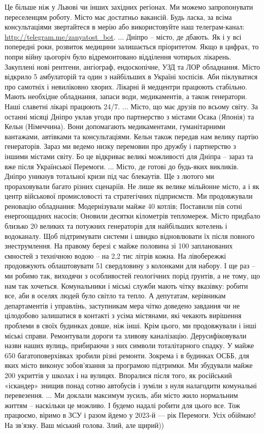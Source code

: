Це більше ніж у Львові чи інших західних регіонах.
Ми можемо запропонувати переселенцям роботу.
Місто має достатньо вакансій. Будь ласка, за всіма консультаціями звертайтеся в
мерію або використовуйте наш телеграм-канал: \url{http://telegram.me/zanyatost_bot}.
...
Дніпро – місто, де дбають. 
Як і у всі попередні роки, розвиток медицини залишається пріоритетом. 
Якщо в цифрах, то попри війну цьогоріч було відремонтовано відділення чотирьох лікарень. 
Закуплені нові рентгени, ангіограф, ендоскопічне, УЗД та ЛОР обладнання.
Місто відкрило 5 амбулаторій та один з найбільших в Україні хоспісів. 
Аби піклуватися про самотніх і невиліковно хворих. 
Лікарні й медцентри працюють стабільно. Мають необхідне обладнання, запаси води, медикаментів, а також генератори. Наші славетні лікарі працюють 24/7.
...
Місто, що має друзів по всьому світу.
За останні місяці Дніпро уклав угоди про партнерство з містами Осака (Японія) та Кельн (Німеччина). 
Вони допомагають медикаментами, гуманітарними вантажами, автівками та консультаціями.  
Кельн також передав нам велику партію генераторів. 
Зараз ми ведемо низку перемовин про дружбу і партнерство з іншими містами світу. 
Бо це відкриває великі можливості для Дніпра – зараз та вже після Української Перемоги. 
...
Місто, де готові до будь-яких викликів.
Дніпро уникнув тотальної кризи під час блекаутів. 
Ще з лютого ми прораховували багато різних сценаріїв. 
Не лише як велике мільйонне місто, а і як центр військової промисловості та стратегічних підприємств.
Ми продовжували реновацію обладнання:
Модернізували майже 40 котлів;
Поставили пів сотні енергоощадних насосів;
Оновили десятки кілометрів тепломереж.
Місто придбало близько 20 великих та потужних генераторів для найбільших котелень і водоканалу. Щоб підтримувати системи і швидко відновлювати їх після повного знеструмлення.
На правому березі є майже половина зі 100 запланованих ємностей з технічною водою – на 2,2 тис літрів кожна.   
На лівобережжі продовжують облаштовувати 51 свердловину з  колонками для набору. 
І ще раз – ми робимо так, виходячи з особливостей геологічних порід ґрунтів, а не тому, що нам так хочеться. 
Комунальники і міські служби мають чітку вказівку: робити все,  аби в оселях людей було світло та тепло. А депутатам, керівникам департаментів і управлінь, заступникам мера чітко доведено завдання чи не цілодобово залишатися в контакті з усіма містянами, які чекають вирішення проблеми в своїх будинках довше, ніж інші.
Крім цього, ми продовжували і інші міські справи. 
Ремонтували дороги та зливову каналізацію. 
Дерусифіковували назви наших вулиць, прибираючи з них символи тоталітарного спадку. 
У майже 650 багатоповерхівках зробили різні ремонти. 
Зокрема і в будинках ОСББ, для яких місто виконує зобов'язання за програмою підтримки. 
Ми збудували майже 200 укриттів у школах і на вулицях. 
Впоралися після того, як російський «іскандер» знищив понад сотню автобусів і зуміли з нуля налагодити комунальні перевезення.
...
Ми доклали максимум зусиль, аби місто жило нормальним життям – наскільки це можливо. 
І будемо надалі робити для цього все. 
Тож працюємо, віримо в ЗСУ і разом йдемо у 2023-й — рік Перемоги.
Усіх обіймаю!
На зв'язку.
Ваш міський голова. 
Злий, але щирий))
\restorecr
